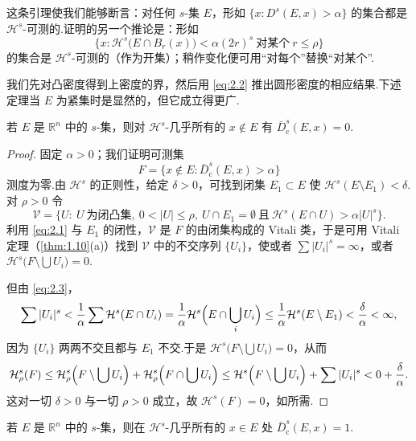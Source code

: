 这条引理使我们能够断言：对任何 $s$-集 $E$，形如 $\{x:D^s(E,x)>\alpha\}$ 的集合都是 $\mathcal{H}^s$-可测的.证明的另一个推论是：形如
\[
  \{x:\mathcal{H}^{s}\bigl(E\cap B_r(x)\bigr)<\alpha(2r)^{s}\ \text{对某个}\ r\leq\rho\}
\]
的集合是 $\mathcal{H}^s$-可测的（作为开集）；稍作变化便可用``对每个''替换``对某个''.

我们先对凸密度得到上密度的界，然后用 \eqref{eq:2.2} 推出圆形密度的相应结果.下述定理当 $E$ 为紧集时是显然的，但它成立得更广.

\begin{theorem}\label{thm:2.2}
若 $E$ 是 $\mathbb{R}^n$ 中的 $s$-集，则对 $\mathcal{H}^s$-几乎所有的 $x\notin E$ 有 $\bar{D}^s_{\mathrm{c}}(E,x)=0$.
\end{theorem}

\begin{proof}
固定 $\alpha>0$；我们证明可测集
\[
  F=\{x\notin E:\bar{D}^{s}_{\mathrm{c}}(E,x)>\alpha\}
\]
测度为零.由 $\mathcal{H}^s$ 的正则性，给定 $\delta>0$，可找到闭集 $E_1\subset E$ 使 $\mathcal{H}^s(E\setminus E_1)<\delta$.对 $\rho>0$ 令
\begin{equation}\label{eq:2.3}
  \mathcal{V}=\bigl\{U:\ U\ \text{为闭凸集},\ 0<|U|\leq\rho,\ U\cap E_1=\emptyset
  \ \text{且}\ \mathcal{H}^{s}(E\cap U)>\alpha|U|^{s}\bigr\}.
\end{equation}
利用 \eqref{eq:2.1} 与 $E_1$ 的闭性，$\mathcal{V}$ 是 $F$ 的由闭集构成的 Vitali 类，于是可用 Vitali 定理（\cref{thm:1.10}(a)）找到 $\mathcal{V}$ 中的不交序列 $\{U_i\}$，使或者 $\sum|U_i|^s=\infty$，或者 $\mathcal{H}^s\bigl(F\setminus\bigcup U_i\bigr)=0$.

但由 \eqref{eq:2.3}，
\[
  \sum|U_i|^{s}
  <\frac{1}{\alpha}\sum\mathcal{H}^{s}(E\cap U_i)
  =\frac{1}{\alpha}\mathcal{H}^{s}\Bigl(E\cap\bigcup_{i}U_i\Bigr)
  \leq\frac{1}{\alpha}\mathcal{H}^{s}(E\setminus E_1)
  <\frac{\delta}{\alpha}<\infty,
\]
因为 $\{U_i\}$ 两两不交且都与 $E_1$ 不交.于是 $\mathcal{H}^s\bigl(F\setminus\bigcup U_i\bigr)=0$，从而
\[
  \mathcal{H}^{s}_{\rho}(F)
  \leq\mathcal{H}^{s}_{\rho}\Bigl(F\setminus\bigcup U_i\Bigr)+\mathcal{H}^{s}_{\rho}\Bigl(F\cap\bigcup U_i\Bigr)
  \leq\mathcal{H}^{s}\Bigl(F\setminus\bigcup U_i\Bigr)+\sum|U_i|^{s}
  <0+\frac{\delta}{\alpha}.
\]
这对一切 $\delta>0$ 与一切 $\rho>0$ 成立，故 $\mathcal{H}^s(F)=0$，如所需.
\end{proof}

\begin{theorem}\label{thm:2.3}
若 $E$ 是 $\mathbb{R}^n$ 中的 $s$-集，则在 $\mathcal{H}^s$-几乎所有的 $x\in E$ 处 $\bar{D}^s_{\mathrm{c}}(E,x)=1$.
\end{theorem}

